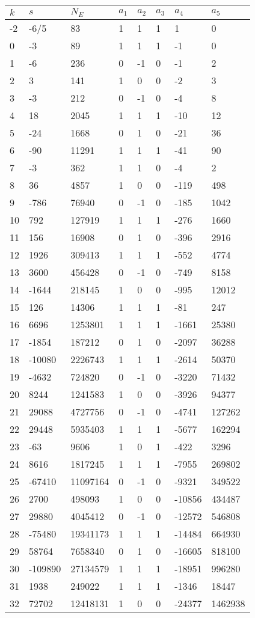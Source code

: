 \documentclass{amsart}
\begin{document}
\begin{longtable}{|l|l|l|lllll|}
\hline
$k$ & $s$ & $N_E$ & $a_1$ & $a_2$ & $a_3$ & $a_4$ & $a_5$\\
\hline
-2&-6/5&83&1&1&1&1&0\\
0&-3&89&1&1&1&-1&0\\
1&-6&236&0&-1&0&-1&2\\
2&3&141&1&0&0&-2&3\\
3&-3&212&0&-1&0&-4&8\\
4&18&2045&1&1&1&-10&12\\
5&-24&1668&0&1&0&-21&36\\
6&-90&11291&1&1&1&-41&90\\
7&-3&362&1&1&0&-4&2\\
8&36&4857&1&0&0&-119&498\\
9&-786&76940&0&-1&0&-185&1042\\
10&792&127919&1&1&1&-276&1660\\
11&156&16908&0&1&0&-396&2916\\
12&1926&309413&1&1&1&-552&4774\\
13&3600&456428&0&-1&0&-749&8158\\
14&-1644&218145&1&0&0&-995&12012\\
15&126&14306&1&1&1&-81&247\\
16&6696&1253801&1&1&1&-1661&25380\\
17&-1854&187212&0&1&0&-2097&36288\\
18&-10080&2226743&1&1&1&-2614&50370\\
19&-4632&724820&0&-1&0&-3220&71432\\
20&8244&1241583&1&0&0&-3926&94377\\
21&29088&4727756&0&-1&0&-4741&127262\\
22&29448&5935403&1&1&1&-5677&162294\\
23&-63&9606&1&0&1&-422&3296\\
24&8616&1817245&1&1&1&-7955&269802\\
25&-67410&11097164&0&-1&0&-9321&349522\\
26&2700&498093&1&0&0&-10856&434487\\
27&29880&4045412&0&-1&0&-12572&546808\\
28&-75480&19341173&1&1&1&-14484&664930\\
29&58764&7658340&0&1&0&-16605&818100\\
30&-109890&27134579&1&1&1&-18951&996280\\
31&1938&249022&1&1&1&-1346&18447\\
32&72702&12418131&1&0&0&-24377&1462938\\

\end{longtable}
\end{document}
